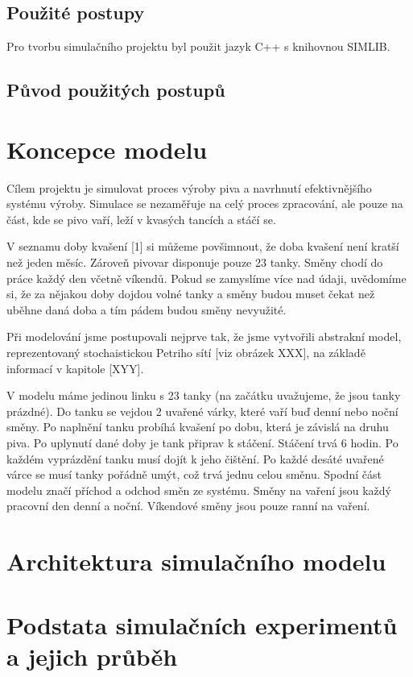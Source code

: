 \documentclass[11pt,a4paper]{article}
\begin{document}
\subsection{Použité postupy}
Pro tvorbu simulačního projektu byl použit jazyk C++ s knihovnou SIMLIB. 

\subsection{Původ použitých postupů}


\section{Koncepce modelu}
Cílem projektu je simulovat proces výroby piva a navrhnutí efektivnějšího systému výroby. Simulace se nezaměřuje na celý proces zpracování, ale pouze na část, kde se pivo vaří, leží v kvasých tancích a stáčí se.

V seznamu doby kvašení [1] si můžeme povšimnout, že doba kvašení není kratší než jeden měsíc. Zároveň pivovar disponuje pouze 23 tanky. Směny chodí do práce každý den včetně víkendů. Pokud se zamyslíme více nad údaji, uvědomíme si, že za nějakou doby dojdou volné tanky a směny budou muset čekat než uběhne daná doba a tím pádem budou směny nevyužité. 

Při modelování jsme postupovali nejprve tak, že jsme vytvořili abstrakní model, reprezentovaný stochaistickou Petriho sítí [viz obrázek XXX], na základě informací v kapitole [XYY].

V modelu máme jedinou linku s 23 tanky (na začátku uvažujeme, že jsou tanky prázdné). Do tanku se vejdou 2 uvařené várky, které vaří buď denní nebo noční směny. Po naplnění tanku probíhá kvašení po dobu, která je závislá na druhu piva. Po uplynutí dané doby je tank připrav k stáčení. Stáčení trvá 6 hodin. Po každém vyprázdění tanku musí dojít k jeho čištění. Po každé desáté uvařené várce se musí tanky pořádně umýt, což trvá jednu celou směnu. Spodní část modelu značí příchod a odchod směn ze systému. Směny na vaření jsou každý pracovní den denní a noční. Víkendové směny jsou pouze ranní na vaření.



\section{Architektura simulačního modelu}


\section{Podstata simulačních experimentů a jejich průběh}
\end{document}
